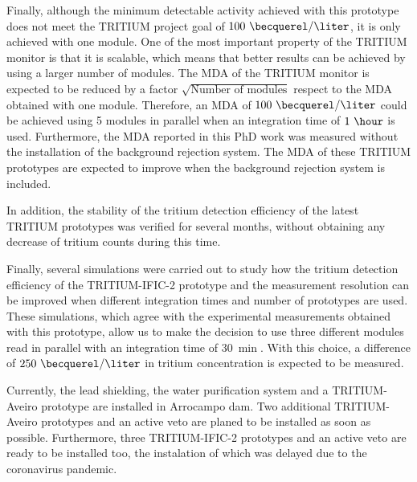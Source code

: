 Finally, although the minimum detectable activity achieved with this prototype does not meet the TRITIUM project goal of $100~\becquerel/\liter$, it is only achieved with one module. One of the most important property of the TRITIUM monitor is that it is scalable, which means that better results can be achieved by using a larger number of modules. The MDA of the TRITIUM monitor is expected to be reduced by a factor $\sqrt{\text{Number of modules}}$ respect to the MDA obtained with one module. Therefore, an MDA of  $100~\becquerel/\liter$ could be achieved using 5 modules in parallel when an integration time of $1~\hour$ is used. Furthermore, the MDA reported in this PhD work was measured without the installation of the background rejection system. The MDA of these TRITIUM prototypes are expected to improve when the background rejection system is included.

In addition, the stability of the tritium detection efficiency of the latest TRITIUM prototypes was verified for several months, without obtaining any decrease of tritium counts during this time.

Finally, several simulations were carried out to study how the tritium detection efficiency of the TRITIUM-IFIC-2 prototype and the measurement resolution can be improved when different integration times and number of prototypes are used. These simulations, which agree with the experimental measurements obtained with this prototype, allow us to make the decision to use three different modules read in parallel with an integration time of $30~\min$. With this choice, a difference of $250~\becquerel/\liter$ in tritium concentration is expected to be measured.

Currently, the lead shielding, the water purification system and a TRITIUM-Aveiro prototype are installed in Arrocampo dam. Two additional TRITIUM-Aveiro prototypes and an active veto are planed to be installed as soon as possible. Furthermore, three TRITIUM-IFIC-2 prototypes and an active veto are ready to be installed too, the instalation of which was delayed due to the coronavirus pandemic.